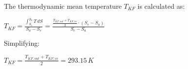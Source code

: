 The thermodynamic mean temperature \( T_{KF} \) is calculated as:  

\( T_{KF} = \frac{\int_{S_e}^{S_a} T \, dS}{S_a - S_e} = \frac{\frac{T_{KF,out} + T_{KF,in}}{2} \cdot (S_e - S_a)}{S_e - S_a} \)  

Simplifying:  

\( T_{KF} = \frac{T_{KF,out} + T_{KF,in}}{2} = 293.15 \, K \)